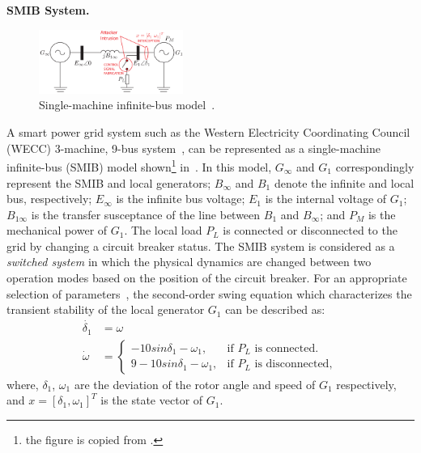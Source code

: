 \vspace{0.5em}
\noindent
{\bf SMIB System.}
%
\begin{figure}[t!]%
	\centering%
    \includegraphics[width=0.42\textwidth]{image/smib}%
	\caption{Single-machine infinite-bus model~\cite{farraj2014practical}.}%
\end{figure}%
%
A smart power grid system such as the Western Electricity Coordinating
Council (WECC) 3-machine, 9-bus system~\cite{sauer1998power}, can be represented as a single-machine infinite-bus (SMIB) model shown\footnote{the figure is copied from \cite{farraj2014practical}.} in~. In this model, $G_\infty$ and $G_1$ correspondingly represent the SMIB and local generators; $B_\infty$ and $B_1$ denote the infinite and local bus, respectively; $E_\infty$ is the infinite bus voltage; $E_1$ is the internal voltage of $G_1$; $B_{1\infty}$ is the transfer susceptance of the line between $B_1$ and $B_\infty$; and $P_M$ is the mechanical power of $G_1$. The local load $P_L$ is connected or disconnected to the grid by changing a circuit breaker status. 
%
The SMIB system is considered as a \emph{switched system} in which the physical dynamics are changed between two operation modes based on the position of the circuit breaker. 
%
%
For an appropriate selection of parameters~\cite{farraj2014practical}, the second-order swing equation which characterizes the transient stability of the local generator $G_1$ can be described as:
%
\begin{align}
\dot{\delta_1} & = \omega \nonumber \\
\dot{\omega} & = 
\begin{cases}
    -10sin\delta_1 - \omega_1, & \text{if $P_L$ is connected}.\\
    9 - 10sin\delta_1 - \omega_1, & \text{if $P_L$ is disconnected},
 \end{cases} \label{eq:smib_dynamics}
\end{align}
%
where, $\delta_1$, $\omega_1$ are the deviation of the rotor angle and speed of $G_1$ respectively, and $x = [\delta_1,\omega_1]^T$ is the state vector of $G_1$.
%
%

